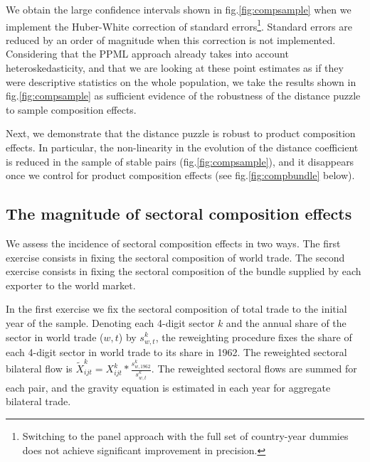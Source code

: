\documentclass[12pt,twoside,a4paper,notitlepage]{article}
\begin{document}
We obtain the large confidence intervals shown in fig.\ref{fig:compsample} when we implement the Huber-White correction of standard errors\footnote{Switching to the panel approach with the full set of country-year dummies does not achieve significant improvement in precision.}.
 Standard errors are reduced by an order of magnitude when this correction is not implemented. 
Considering that the PPML approach already takes into account heteroskedasticity, and that we are looking at these point estimates as if they were descriptive statistics on the whole population, we take the results shown in fig.\ref{fig:compsample} as sufficient evidence of the robustness of the distance puzzle to sample composition effects.


Next, we demonstrate that the distance puzzle is robust to product composition effects.
In particular, the non-linearity in the evolution of the distance coefficient  is reduced in the sample of stable pairs (fig.\ref{fig:compsample}), and it \fi disappears once we control for product composition effects (see fig.\ref{fig:compbundle} below).

\subsection{The magnitude of sectoral composition effects} \label{subsec:robustpuzzle}
We assess the incidence of sectoral composition effects in two ways.
The first exercise consists in fixing the sectoral composition of world trade.
The second exercise consists in fixing the sectoral composition of the bundle supplied by each exporter to the world market.


In the first exercise we fix the sectoral composition of total trade to the initial year of the sample.
Denoting each 4-digit sector $k$ and the annual share of the sector in world trade ($w,t$) by $s^{k}_{w,t}$, the reweighting procedure fixes the share of each 4-digit sector in world trade to its share in 1962.
The reweighted sectoral bilateral flow is $\tilde{X}^k_{ijt}=X^k_{ijt}*\frac{s^k_{w,1962}}{s^k_{w,t}}$.
The reweighted sectoral flows are summed for each pair, and the gravity equation is estimated in each year for aggregate bilateral trade.
\end{document}
